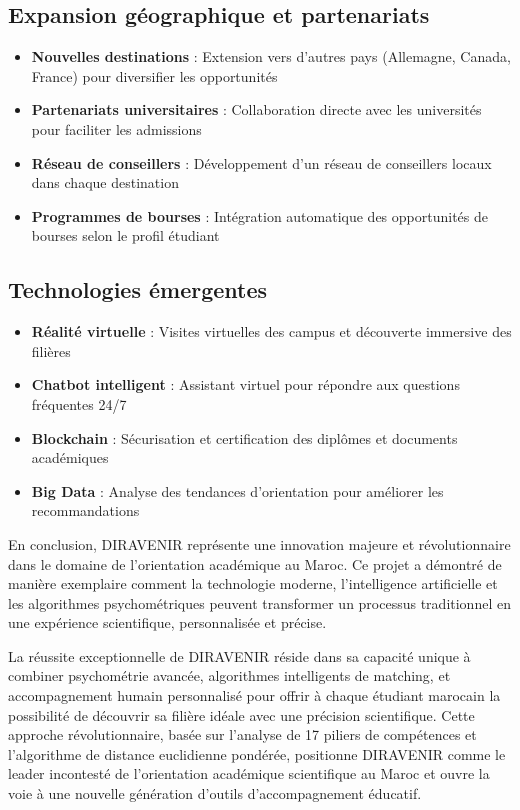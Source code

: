 \documentclass[12pt,a4paper]{report}
\begin{document}
\subsection{Expansion géographique et partenariats}

\begin{itemize}
    \item \textbf{Nouvelles destinations} : Extension vers d'autres pays (Allemagne, Canada, France) pour diversifier les opportunités
    \item \textbf{Partenariats universitaires} : Collaboration directe avec les universités pour faciliter les admissions
    \item \textbf{Réseau de conseillers} : Développement d'un réseau de conseillers locaux dans chaque destination
    \item \textbf{Programmes de bourses} : Intégration automatique des opportunités de bourses selon le profil étudiant
\end{itemize}

\subsection{Technologies émergentes}

\begin{itemize}
    \item \textbf{Réalité virtuelle} : Visites virtuelles des campus et découverte immersive des filières
    \item \textbf{Chatbot intelligent} : Assistant virtuel pour répondre aux questions fréquentes 24/7
    \item \textbf{Blockchain} : Sécurisation et certification des diplômes et documents académiques
    \item \textbf{Big Data} : Analyse des tendances d'orientation pour améliorer les recommandations
\end{itemize}

En conclusion, DIRAVENIR représente une innovation majeure et révolutionnaire dans le domaine de l'orientation académique au Maroc. Ce projet a démontré de manière exemplaire comment la technologie moderne, l'intelligence artificielle et les algorithmes psychométriques peuvent transformer un processus traditionnel en une expérience scientifique, personnalisée et précise.

La réussite exceptionnelle de DIRAVENIR réside dans sa capacité unique à combiner psychométrie avancée, algorithmes intelligents de matching, et accompagnement humain personnalisé pour offrir à chaque étudiant marocain la possibilité de découvrir sa filière idéale avec une précision scientifique. Cette approche révolutionnaire, basée sur l'analyse de 17 piliers de compétences et l'algorithme de distance euclidienne pondérée, positionne DIRAVENIR comme le leader incontesté de l'orientation académique scientifique au Maroc et ouvre la voie à une nouvelle génération d'outils d'accompagnement éducatif.
\end{document}
